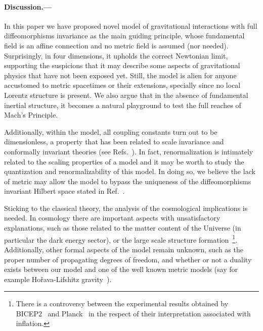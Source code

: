 \documentclass[twocolumn,aps,showpacs,showkeys,prl,superscriptaddress]{revtex4-1}
\begin{document}
\paragraph{\label{sec:dis}Discussion.---}
In this paper we have proposed novel model of gravitational interactions with full diffeomorphisms invariance as the main guiding principle, whose fundamental field is an affine connection and no metric field is assumed (nor needed). Surprisingly, in four dimensions, it upholds the correct Newtonian limit, supporting the suspicions that it may describe some aspects of gravitational physics that have not been exposed yet. Still, the model is alien for anyone accustomed to metric spacetimes or their extensions, specially since no local Lorentz structure is present. We also argue that in the absence of fundamental inertial structure, it becomes a natural playground to test the full reaches of Mach's Principle.

Additionally, within the model, all coupling constants turn out to be dimensionless, a property that has been related to scale invariance and conformally invariant theories (see Refs.~\cite{Buchholz:1976hz,Maldacena:2011mk}). In fact, renormalization is intimately related to the scaling properties of a model and it may be worth to study the quantization and renormalizability of this  model. In doing so, we believe the lack of metric may allow the model to bypass the uniqueness of the diffeomorphisms invariant Hilbert space stated in Ref.~\cite{Lewandowski:2005jk}.

Sticking to the classical theory, the analysis of the cosmological implications is needed. In cosmology there are important aspects with unsatisfactory explanations, such as those related to the matter content of the Universe (in particular the dark energy sector), or the large scale structure formation~\footnote{There is a controversy between the experimental results obtained by BICEP2~\cite{Ade:2014xna} and Planck~\cite{Adam:2014bub} in the respect of their interpretation associated with inflation.}. Additionally, other formal aspects of the model remain unknown, such as the proper number of propagating degrees of freedom, and whether or not a duality exists between our model and one of the well known metric models (say for example Ho\v{r}ava-Lifshitz gravity~\cite{Horava:2009uw,*Sotiriou:2010wn}).
\end{document}

